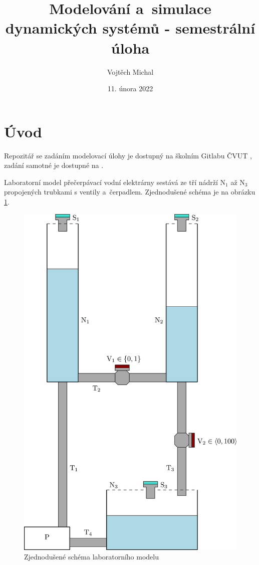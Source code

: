\documentclass[conference]{IEEEtran}
\title{Modelování a~simulace dynamických systémů - semestrální úloha}
\author{Vojtěch Michal}
\date{11. února 2022}
\begin{document}
\maketitle

\section{Úvod}

Repozitář se zadáním modelovací úlohy je dostupný na školním Gitlabu ČVUT \cite{repository}, zadání samotné je dostupné na \cite{zadani}.

Laboratorní model přečerpávací vodní elektrárny sestává ze tří nádrží $\text{N}_1$ až $\text{N}_3$ propojených trubkami
s ventily a~čerpadlem. Zjednodušené schéma je na obrázku \ref{fig:schema}.

\begin{figure}[htbp]
    \centering
    \includegraphics[width=\linewidth]{vodarna_schema.eps}
    \caption{Zjednodušené schéma laboratorního modelu}
    \label{fig:schema}
\end{figure}
\end{document}
